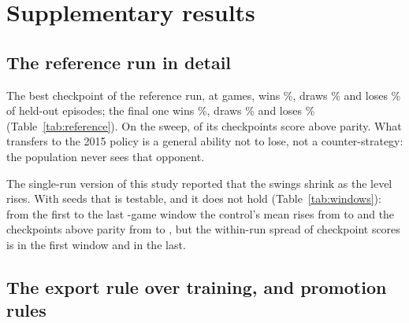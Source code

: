 \documentclass[11pt]{article}
\begin{document}



\appendix
\FloatBarrier
\section{Supplementary results}
\label{app:results}

\FloatBarrier
\subsection{The reference run in detail}
\label{app:reference}

The best checkpoint of the reference run, at \nRefPeakT{} games, wins
\nRefPeakWinPct\%, draws \nRefPeakTiePct\% and loses \nRefPeakLossPct\% of
held-out episodes; the final one wins \nRefFinalWinPct\%, draws
\nRefFinalTiePct\% and loses \nRefFinalLossPct\% (Table~\ref{tab:reference}). On
the sweep, \nRefAboveCkpt{} of its checkpoints score above parity. What
transfers to the 2015 policy is a general ability not to lose, not a
counter-strategy: the population never sees that opponent.

The single-run version of this study reported that the swings shrink as the
level rises. With \nCtrlRuns{} seeds that is testable, and it does not hold
(Table~\ref{tab:windows}): from the first to the last \nLateWindow-game window
the control's mean rises from \nWindowLevelFirst{} to \nWindowLevelLast{} and the
checkpoints above parity from \nWindowAboveFirst{} to \nWindowAboveLast, but the
within-run spread of checkpoint scores is \nWindowSdFirst{} in the first window
and \nWindowSdLast{} in the last.

\begin{table}[!htbp]
\centering\small
\caption{The reference run: final and best checkpoint, held out.}
\label{tab:reference}
\resizebox{\linewidth}{!}{}
\end{table}

\begin{table}[!htbp]
\centering\small
\caption{The control in \nLateWindow-game windows: mean score across seeds,
within-run spread of checkpoint scores, spread of window means across seeds,
and checkpoints above parity.}
\label{tab:windows}

\end{table}

\FloatBarrier
\subsection{The export rule over training, and promotion rules}
\label{app:export}
\end{document}
